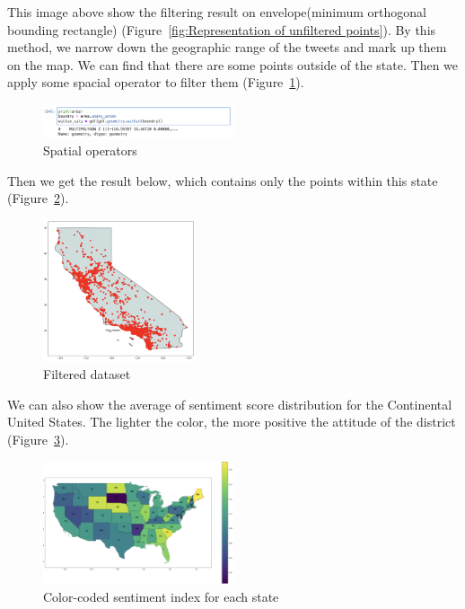 This image above show the filtering result on envelope(minimum orthogonal
bounding rectangle) (Figure~\ref{fig:Representation of unfiltered points}). By this method, we narrow down the geographic
range of the tweets and mark up them on the map. We can find that there are
some points outside of the state. Then we apply some spacial operator to
filter them (Figure~\ref{fig:Spatial operators}).
\begin{figure}[h]
    \centering
    \includegraphics[width=0.5\textwidth]{imgs/sp_operator.png}
    \caption{\label{fig:Spatial operators}Spatial operators}
\end{figure}
Then we get the result below, which contains only the points within this
state (Figure~\ref{fig:Filtered dataset}).
\begin{figure}[h]
    \centering
    \includegraphics[width=0.4\textwidth]{imgs/ca1_result.png}
    \caption{\label{fig:Filtered dataset}Filtered dataset}
\end{figure}
We can also show the average of sentiment score distribution for the
Continental United States. The lighter the color, the more positive the
attitude of the district (Figure~\ref{fig:Color-coded sentiment index}).
\begin{figure}[h]
    \centering
    \includegraphics[width=0.5\textwidth]{imgs/USA_info.png}
    \caption{\label{fig:Color-coded sentiment index}Color-coded sentiment index for each state}
\end{figure}
